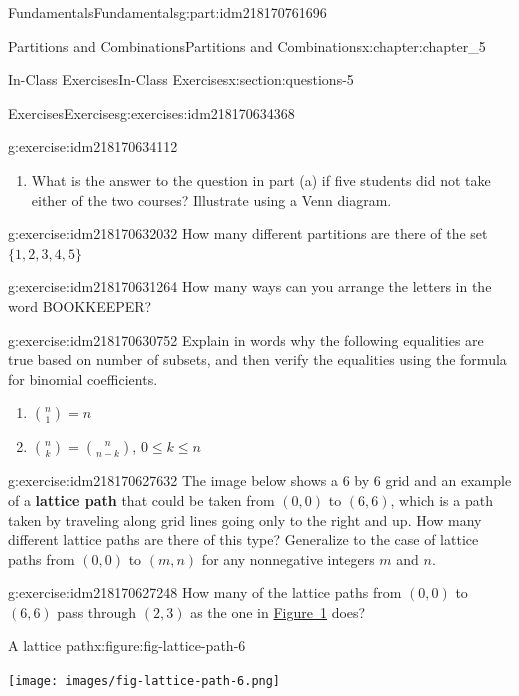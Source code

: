 \documentclass[oneside,10pt,]{book}
\newcommand{\terminology}[1]{\textbf{#1}}
\numberwithin{equation}{section}
\begin{document}
\begin{partptx}{Fundamentals}{}{Fundamentals}{}{}{g:part:idm218170761696}
\begin{chapterptx}{Partitions and Combinations}{}{Partitions and Combinations}{}{}{x:chapter:chapter_5}
\begin{sectionptx}{In-Class Exercises}{}{In-Class Exercises}{}{}{x:section:questions-5}
\begin{exercises-subsection-numberless}{Exercises}{}{Exercises}{}{}{g:exercises:idm218170634368}
\begin{exercisegroup}
\begin{divisionexerciseeg}{1}{}{}{g:exercise:idm218170634112}
\begin{enumerate}[label=(\alph*)]
\item{}What is the answer to the question in part (a) if five students did not take either of the two courses? Illustrate using a Venn diagram.%
\end{enumerate}
%
\end{divisionexerciseeg}%
\begin{divisionexerciseeg}{2}{}{}{g:exercise:idm218170632032}%
How many different partitions are there of the set \(\{1,2,3,4,5\}\)%
\end{divisionexerciseeg}%
\begin{divisionexerciseeg}{3}{}{}{g:exercise:idm218170631264}%
How many ways can you arrange the letters in the word BOOKKEEPER?%
\end{divisionexerciseeg}%
\begin{divisionexerciseeg}{4}{}{}{g:exercise:idm218170630752}%
Explain in words why the following equalities are true based on number of subsets,  and then verify the equalities using the formula for binomial coefficients.%
\par
%
\begin{enumerate}[label=(\alph*)]
\item{}\(\displaystyle \binom{n}{1} = n\)%
\item{}\(\binom{n}{k} = \binom{n}{n-k}\), \(0 \leq k \leq n\)%
\end{enumerate}
%
\end{divisionexerciseeg}%
\begin{divisionexerciseeg}{5}{}{}{g:exercise:idm218170627632}%
The image below shows a 6 by 6 grid and an example of a \terminology{lattice path} that could be taken from \((0,0)\)  to \((6,6)\), which is a path taken by traveling along grid lines going only to the right and up. How many different lattice paths are there of this type?  Generalize to the case of lattice paths from \((0,0)\) to \((m,n)\)  for any nonnegative integers \(m\) and \(n\).%
\end{divisionexerciseeg}%
\begin{divisionexerciseeg}{6}{}{}{g:exercise:idm218170627248}%
How many of the lattice paths from \((0,0)\) to \((6,6)\) pass through \((2,3)\) as the one in \hyperref[x:figure:fig-lattice-path-6]{Figure~1} does?%
\begin{figureptx}{A lattice path}{x:figure:fig-lattice-path-6}{}%
\begin{image}{0.25}{0.5}{0.25}%
\texttt{[image: images/fig-lattice-path-6.png]}
\end{image}%
\tcblower

\end{figureptx}
\end{divisionexerciseeg}
\end{exercisegroup}
\end{exercises-subsection-numberless}
\end{sectionptx}
\end{chapterptx}
\end{partptx}
\end{document}

